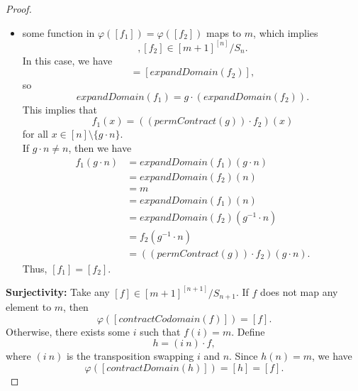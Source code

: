 \begin{proof}
\begin{itemize}
    \item some function in $\varphi([f_1]) = \varphi([f_2])$ maps to $m$, which implies
          \begin{equation*}
            [f_1], [f_2] \in [m + 1]^{[n]}/S_n.
          \end{equation*}
          In this case, we have
          \begin{equation*}
            [\textit{expandDomain}(f_1)] = [\textit{expandDomain}(f_2)],
          \end{equation*}
          so
          \begin{equation*}
            \textit{expandDomain}(f_1) = g \cdot (\textit{expandDomain}(f_2)).
          \end{equation*}
          This implies that
          \begin{equation*}
            f_1(x) = ((\textit{permContract}(g)) \cdot f_2)(x)
          \end{equation*}
          for all $x \in [n] \setminus \{g \cdot n\}$. \\
          If $g \cdot n \neq n$, then we have
          \begin{align*}
            f_1(g \cdot n) &= \textit{expandDomain}(f_1)(g \cdot n) \\
            &= \textit{expandDomain}(f_2)(n) \\
            &= m \\
            &= \textit{expandDomain}(f_1)(n) \\
            &= \textit{expandDomain}(f_2)(g^{-1} \cdot n) \\
            &= f_2(g^{-1} \cdot n) \\
            &= ((\textit{permContract}(g)) \cdot f_2)(g \cdot n).
          \end{align*}
          Thus, $[f_1] = [f_2]$.
  \end{itemize}
  \textbf{Surjectivity:} Take any $[f] \in [m + 1]^{[n + 1]}/S_{n + 1}$. If $f$ does not map any element to $m$, then
  \begin{equation*}
    \varphi([\textit{contractCodomain}(f)]) = [f].
  \end{equation*}
  Otherwise, there exists some $i$ such that $f(i) = m$. Define
  \begin{equation*}
    h = (i\ n) \cdot f,
  \end{equation*}
  where $(i\ n)$ is the transposition swapping $i$ and $n$. Since $h(n) = m$, we have
  \begin{equation*}
    \varphi([\textit{contractDomain}(h)]) = [h] = [f].
  \end{equation*}
\end{proof}

